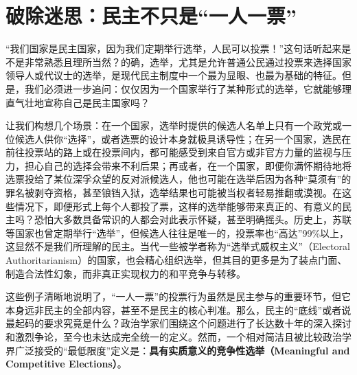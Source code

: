 \documentclass[UTF8, 10pt]{ctexbook}
\begin{document}
\section{破除迷思：民主不只是“一人一票”}

\lettrine[lines=2]{“}{我们}国家是民主国家，因为我们定期举行选举，人民可以投票！”这句话听起来是不是非常熟悉且理所当然？的确，选举，尤其是允许普通公民通过投票来选择国家领导人或代议士的选举，是现代民主制度中一个最为显眼、也最为基础的特征。但是，我们必须进一步追问：仅仅因为一个国家举行了某种形式的选举，它就能够理直气壮地宣称自己是民主国家吗？

让我们构想几个场景：在一个国家，选举时提供的候选人名单上只有一个政党或一位候选人供你“选择”，或者选票的设计本身就极具诱导性；在另一个国家，选民在前往投票站的路上或在投票间内，都可能感受到来自官方或非官方力量的监视与压力，担心自己的选择会带来不利后果；再或者，在一个国家，即便你满怀期待地将选票投给了某位深孚众望的反对派候选人，他也可能在选举后因为各种“莫须有”的罪名被剥夺资格，甚至锒铛入狱，选举结果也可能被当权者轻易推翻或漠视。在这些情况下，即便形式上每个人都投了票，这样的选举能够带来真正的、有意义的民主吗？恐怕大多数具备常识的人都会对此表示怀疑，甚至明确摇头。历史上，苏联等国家也曾定期举行“选举”，但候选人往往是唯一的，投票率也“高达”99\%以上，这显然不是我们所理解的民主。当代一些被学者称为“选举式威权主义”（Electoral Authoritarianism）的国家，也会精心组织选举，但其目的更多是为了装点门面、制造合法性幻象，而非真正实现权力的和平竞争与转移。

这些例子清晰地说明了，“一人一票”的投票行为虽然是民主参与的重要环节，但它本身远非民主的全部内容，甚至不是民主的核心判准。那么，民主的“底线”或者说最起码的要求究竟是什么？政治学家们围绕这个问题进行了长达数十年的深入探讨和激烈争论，至今也未达成完全统一的定义。然而，一个相对简洁且被比较政治学界广泛接受的“最低限度”定义是：\textbf{具有实质意义的竞争性选举（Meaningful and Competitive Elections）}。
\end{document}
